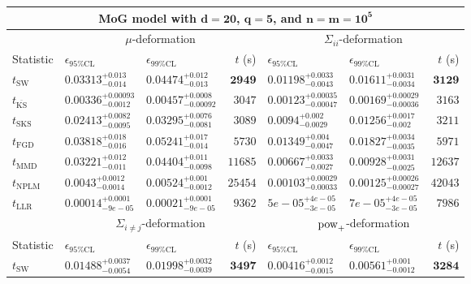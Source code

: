 \begin{tabular}{l|llr|llr}
	\toprule
	\multicolumn{7}{c}{{\bf MoG model with $\mathbf{d=20}$, $\mathbf{q=5}$, and $\mathbf{n=m=10^{5}}$}} \\
	\toprule
	\multicolumn{1}{c}{} & \multicolumn{3}{c}{$\mu$-deformation} & \multicolumn{3}{c}{$\Sigma_{ii}$-deformation} \\
	Statistic & $\epsilon_{95\%\mathrm{CL}}$ & $\epsilon_{99\%\mathrm{CL}}$ & $t$ (s) & $\epsilon_{95\%\mathrm{CL}}$ & $\epsilon_{99\%\mathrm{CL}}$ & $t$ (s) \\
	\midrule
	$t_{\mathrm{SW}}$ & $0.03313_{-0.014}^{+0.013}$ & $0.04474_{-0.013}^{+0.012}$ & ${\mathbf{2949}}$ & $0.01198_{-0.0043}^{+0.0033}$ & $0.01611_{-0.0034}^{+0.0031}$ & ${\mathbf{3129}}$ \\
	$t_{\overline{\mathrm{KS}}}$ & ${\mathbf{0.00336_{-0.0012}^{+0.00093}}}$ & ${\mathbf{0.00457_{-0.00092}^{+0.0008}}}$ & $3047$ & ${\mathbf{0.00123_{-0.00047}^{+0.00035}}}$ & ${\mathbf{0.00169_{-0.00036}^{+0.00029}}}$ & $3163$ \\
	$t_{\mathrm{SKS}}$ & $0.02413_{-0.0095}^{+0.0082}$ & $0.03295_{-0.0081}^{+0.0076}$ & $3089$ & $0.0094_{-0.0029}^{+0.002}$ & $0.01256_{-0.002}^{+0.0017}$ & $3211$ \\
	$t_{\mathrm{FGD}}$ & $0.03818_{-0.016}^{+0.018}$ & $0.05241_{-0.014}^{+0.017}$ & $5730$ & $0.01349_{-0.0047}^{+0.004}$ & $0.01827_{-0.0035}^{+0.0034}$ & $5971$ \\
	$t_{\mathrm{MMD}}$ & $0.03221_{-0.011}^{+0.012}$ & $0.04404_{-0.0098}^{+0.011}$ & $11685$ & $0.00667_{-0.0027}^{+0.0033}$ & $0.00928_{-0.0025}^{+0.0031}$ & $12637$ \\
\rowcolor{red!35}	$t_{\mathrm{NPLM}}$ & $0.0043_{-0.0014}^{+0.0012}$ & $0.00524_{-0.0012}^{+0.001}$ & $25454$ & $0.00103_{-0.00033}^{+0.00029}$ & $0.00125_{-0.00027}^{+0.00026}$ & $42043$ \\
	$t_{\mathrm{LLR}}$ & $0.00014_{-9e-05}^{+0.0001}$ & $0.00021_{-9e-05}^{+0.0001}$ & $9362$ & $5e-05_{-3e-05}^{+4e-05}$ & $7e-05_{-3e-05}^{+4e-05}$ & $7986$ \\
	\toprule
	\multicolumn{1}{c}{} & \multicolumn{3}{c}{$\Sigma_{i\neq j}$-deformation} & \multicolumn{3}{c}{$\rm{pow}_{+}$-deformation} \\
	Statistic & $\epsilon_{95\%\mathrm{CL}}$ & $\epsilon_{99\%\mathrm{CL}}$ & $t$ (s) & $\epsilon_{95\%\mathrm{CL}}$ & $\epsilon_{99\%\mathrm{CL}}$ & $t$ (s) \\
	\midrule
	$t_{\mathrm{SW}}$ & $0.01488_{-0.0054}^{+0.0037}$ & $0.01998_{-0.0039}^{+0.0032}$ & ${\mathbf{3497}}$ & $0.00416_{-0.0015}^{+0.0012}$ & $0.00561_{-0.0012}^{+0.001}$ & ${\mathbf{3284}}$ \\

\end{tabular}
